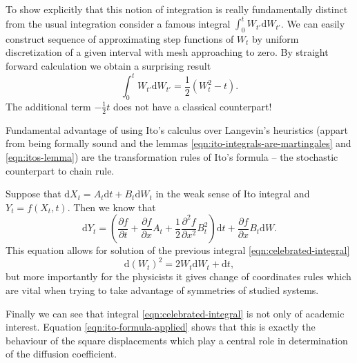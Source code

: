\documentclass{doctoral}
\newcommand{\pd}{\partial}
\newcommand{\dd}{\mathrm{d}}
\begin{document}
To show explicitly that this notion of integration is really fundamentally distinct from the usual integration consider a famous integral $\int_0^t W_{t'} \dd W_{t'}$.
We can easily construct sequence of approximating step functions of $W_{t}$ by uniform discretization of a given interval with mesh approaching to zero.
By straight forward calculation we obtain a surprising result
\begin{equation}
    \int_{0}^{t} W_{t'} \dd W_{t'} = \frac{1}{2} \left( W_t^2 - t \right).
    \label{eqn:celebrated-integral}
\end{equation}
The additional term $-\frac{1}{2}t$ does not have a classical counterpart!

Fundamental advantage of using Ito's calculus over Langevin's heuristics (appart from being formally sound and the lemmas \eqref{eqn:ito-integrals-are-martingales} and \eqref{eqn:itos-lemma}) are the transformation rules of Ito's formula -- the stochastic counterpart to chain rule.

Suppose that $\dd X_t = A_t \dd t + B_t \dd W_t$ in the weak sense of Ito integral and $Y_t = f(X_t,t)$.
Then we know that
\begin{equation}
    \dd Y_t = \left( \frac{\pd f}{\pd t} + \frac{\pd f}{\pd x} A_t + \frac{1}{2} \frac{\pd^2 f}{\pd x^2} B_t^2 \right) \dd t + \frac{\pd f}{\pd x} B_t \dd W.
    \label{eqn:itos-formula}
\end{equation}
This equation allows for solution of the previous integral \eqref{eqn:celebrated-integral}
\begin{equation}
    \dd (W_t)^2 = 2 W_t \dd W_t + \dd t, \label{eqn:ito-formula-applied}
\end{equation}
but more importantly for the physicists it gives change of coordinates rules which are vital when trying to take advantage of symmetries of studied systems.

Finally we can see that integral \eqref{eqn:celebrated-integral} is not only of academic interest.
Equation \eqref{eqn:ito-formula-applied} shows that this is exactly the behaviour of the square displacements which play a central role in determination of the diffusion coefficient.

\end{document}
